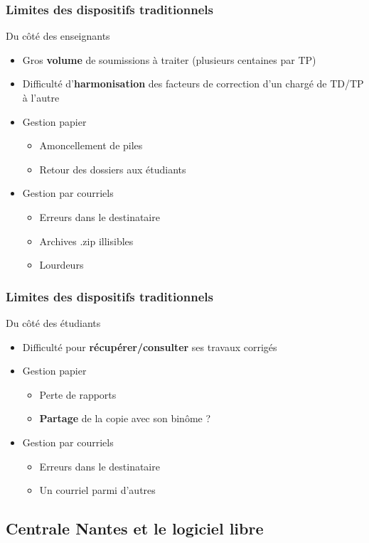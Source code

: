 \documentclass[hyperref,french,usenames,xcolor=dvipsnames]{beamer}
\begin{document}
\frame
{
  \frametitle{Limites des dispositifs traditionnels}

\begin{alertblock}{Du côté des enseignants}
\begin{itemize}
\item Gros \textbf{volume} de soumissions à traiter (plusieurs centaines par TP)
\item Difficulté d'\textbf{harmonisation} des facteurs de correction d'un chargé de TD/TP à l'autre
\item Gestion papier
\begin{itemize}
\item Amoncellement de piles
\item Retour des dossiers aux étudiants
\end{itemize}
\item Gestion par courriels
\begin{itemize}
\item Erreurs dans le destinataire
\item Archives .zip illisibles
\item Lourdeurs
\end{itemize}
\end{itemize}
\end{alertblock}
}

\frame
{
  \frametitle{Limites des dispositifs traditionnels}

\begin{alertblock}{Du côté des étudiants}
\begin{itemize}
\item Difficulté pour \textbf{récupérer/consulter} ses travaux corrigés
\item Gestion papier
\begin{itemize}
\item Perte de rapports
\item \textbf{Partage} de la copie avec son binôme ?
\end{itemize}
\item Gestion par courriels
\begin{itemize}
\item Erreurs dans le destinataire
\item Un courriel parmi d'autres
\end{itemize}
\end{itemize}
\end{alertblock}
}

\subsection*{Centrale Nantes et le logiciel libre}
\end{document}
